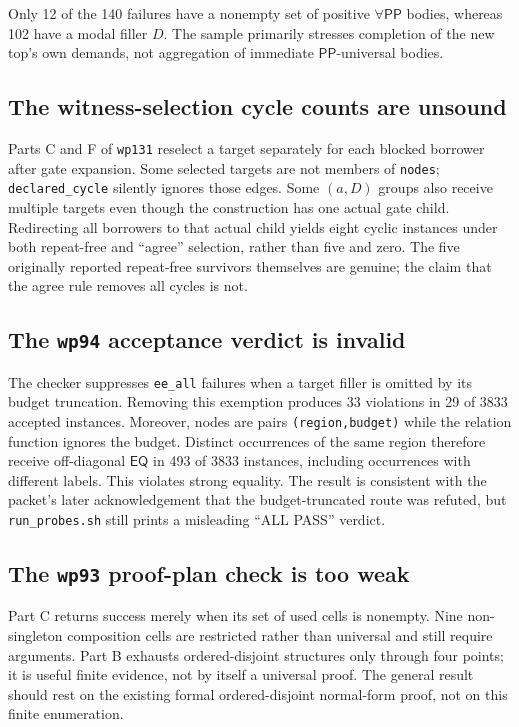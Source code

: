\documentclass[11pt]{article}
\newcommand{\PP}{\mathsf{PP}}
\newcommand{\EQ}{\mathsf{EQ}}
\begin{document}
Only 12 of the 140 failures have a nonempty set of positive $\forall\PP$ bodies, whereas
102 have a modal filler $D$. The sample primarily stresses completion of the new top's own
demands, not aggregation of immediate $\PP$-universal bodies.

\subsection{The witness-selection cycle counts are unsound}

Parts C and F of \texttt{wp131} reselect a target separately for each blocked borrower
after gate expansion. Some selected targets are not members of \texttt{nodes};
\texttt{declared\_cycle} silently ignores those edges. Some $(a,D)$ groups also receive
multiple targets even though the construction has one actual gate child. Redirecting all
borrowers to that actual child yields eight cyclic instances under both repeat-free and
``agree'' selection, rather than five and zero. The five originally reported repeat-free
survivors themselves are genuine; the claim that the agree rule removes all cycles is not.

\subsection{The \texttt{wp94} acceptance verdict is invalid}

The checker suppresses \texttt{ee\_all} failures when a target filler is omitted by its
budget truncation. Removing this exemption produces 33 violations in 29 of 3833 accepted
instances. Moreover, nodes are pairs \texttt{(region,budget)} while the relation function
ignores the budget. Distinct occurrences of the same region therefore receive off-diagonal
$\EQ$ in 493 of 3833 instances, including occurrences with different labels. This violates
strong equality. The result is consistent with the packet's later acknowledgement that the
budget-truncated route was refuted, but \texttt{run\_probes.sh} still prints a misleading
``ALL PASS'' verdict.

\subsection{The \texttt{wp93} proof-plan check is too weak}

Part C returns success merely when its set of used cells is nonempty. Nine non-singleton
composition cells are restricted rather than universal and still require arguments. Part B
exhausts ordered-disjoint structures only through four points; it is useful finite evidence,
not by itself a universal proof. The general result should rest on the existing formal
ordered-disjoint normal-form proof, not on this finite enumeration.
\end{document}
